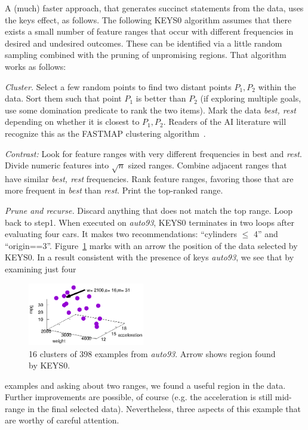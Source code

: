 A (much) faster approach, that generates succinct statements from the data, uses the keys effect, as follows.
The following KEYS0 algorithm assumes that there exists a small number of feature ranges that occur with different frequencies in desired and undesired outcomes. These can be identified via a little random sampling combined with the pruning of unpromising regions. That algorithm works as follows:
\be
\item   {\em Cluster.} Select a few random points to find two
distant points $P_1, P_2$  within the data. Sort them such that point $P_1$ is better than $P_2$
(if exploring multiple goals, use some domination predicate to rank the two items).
Mark the data   {\em best, rest} depending on whether it is
closest to  
$P_1,P_2$. Readers of the AI literature will recognize this as the FASTMAP
clustering algorithm~\cite{faloutsos1995fastmap}.
\item  {\em Contrast:} Look for
feature ranges
with very different frequencies in {\em} best
and {\em  rest}. 
Divide numeric features into 
$\sqrt{n}$  sized ranges. Combine adjacent ranges that have similar {\em best, rest}
frequencies. Rank feature ranges, favoring those that are more frequent in {\em best} than {\em rest}. Print the top-ranked range. 
\item  {\em Prune and recurse.} Discard anything  that does not match the top  range.
Loop back  to step1.
\ee
 When executed on   {\em auto93},
KEYS0
terminates in two loops after evaluating  four cars.
It makes two recommendations:
  ``cylinders $\le$ 4''
and ``origin==3''. 
Figure~\ref{auto} marks with an arrow the position of the data
selected by KEYS0.  In a result consistent with the presence of keys 
{\em auto93}, we see that by examining just four\begin{figure}
\vspace{-5mm}
    \includegraphics[width=2in]{fig/introduction.eps}
    \caption{16 clusters of 398 examples from  {\em auto93}. Arrow
    shows  region found by KEYS0.}\label{auto}
\end{figure}
examples and asking about two
ranges, we   found a useful
region in the data. Further improvements are
possible, of course (e.g. the  acceleration is still
mid-range in the final selected data). Nevertheless,  
 three  aspects of this example that are worthy of
careful attention. 


